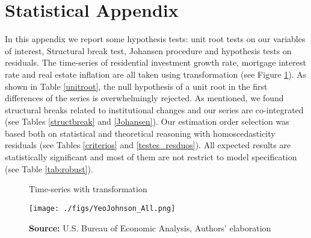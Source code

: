 \documentclass[12pt, a4paper]{article}
\begin{document}
\appendix
\section{Statistical Appendix}
\label{sec:orgf7dedd3}
\label{appen:A}

In this appendix we report some hypothesis tests: unit root tests on our variables of interest, Structural break test, Johansen procedure and hypothesis tests on residuals.
The time-series of residential investment growth rate, mortgage interest rate and real estate inflation are all taken using \textcite{yeo_new_2000} transformation (see Figure \ref{YeoJhonson}).
As shown in Table \ref{unitroot}, the null hypothesis of a unit root in the first differences of the series is overwhelmingly rejected.
As mentioned, we found structural breaks related to institutional changes and our series are co-integrated (see Tables \ref{structbreak} and \ref{Johansen}).
Our estimation order selection was based both on statistical and theoretical reasoning with homoscedasticity residuals (see Tables \ref{criterios} and \ref{testes_resduos}).
All expected results are statistically significant and most of them are not restrict to model specification (see Table \ref{tab:robust}).

\begin{figure}[htb]
	\centering
	\caption{Time-series with \textcite{yeo_new_2000} transformation}
	\label{YeoJhonson}
	\texttt{[image: ./figs/YeoJohnson\_All.png]}
	\caption*{\textbf{Source:} U.S. Bureau of Economic Analysis, Authors' elaboration}
\end{figure}






\end{document}
